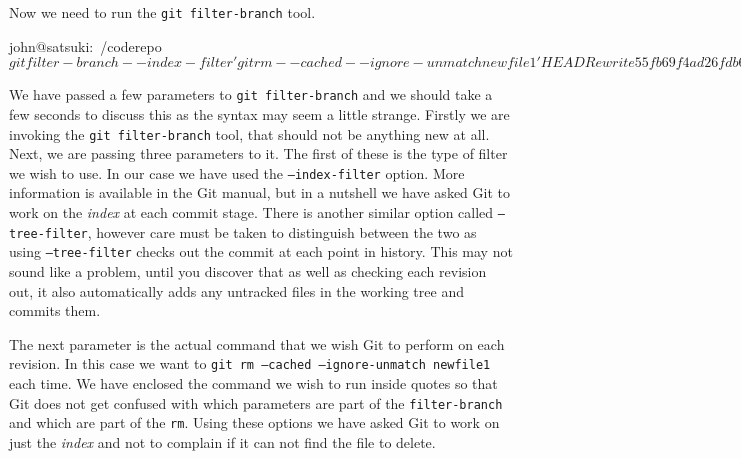 Now we need to run the \texttt{git filter-branch} tool.

\begin{code}
john@satsuki:~/coderepo$ git filter-branch --index-filter 'git rm --cached --ignore-unmatch newfile1' HEAD
Rewrite 55fb69f4ad26fdb6b90ac6f43431be40779962dd (6/21)rm 'newfile1'
Rewrite 9710177657ae00665ca8f8027b17314346a5b1c4 (7/21)rm 'newfile1'
Rewrite 4ac92012609cf8ed2480aa5d7f807caf2545fe2f (8/21)rm 'newfile1'
Rewrite cfbecabb031696a217b77b0e1285f2d5fc2ea2a3 (9/21)rm 'newfile1'
Rewrite b119573f4508514c55e1c4e3bebec0ab3667d071 (10/21)rm 'newfile1'
Rewrite ed2301ba223a63a5a930b536a043444e019460a7 (11/21)rm 'newfile1'
Rewrite a27d49ef11d9f0e66edbad8f6c7806510ad5b2be (12/21)rm 'newfile1'
Rewrite 7cc32dbf121f2afa8c40337db54bafb26de5b9c4 (13/21)rm 'newfile1'
Rewrite d50ffb2fa536d869f2c4e89e8d6a48e0a29c5cc1 (14/21)rm 'newfile1'
Rewrite 9cb2af2a00fd2253060e6bf8cc6c377b3d55ecea (15/21)rm 'newfile1'
Rewrite 37950f861a3cc0868c65ee9571fc6c491aa689ea (16/21)rm 'newfile1'
Rewrite 1c3206aac0fb012bfdaf5ff00e320b565bb89e7d (17/21)rm 'newfile1'
Rewrite 1968324ce2899883fca76bc25496bcf2b15e7011 (18/21)rm 'newfile1'
Rewrite f8d5100142b43ffaba9bbd539ba4fd92af79bf0e (19/21)rm 'newfile1'
Rewrite a8281fb589e36389cc8cb0da7ebee225b4d1adfc (20/21)rm 'newfile1'
Rewrite 30900fe1b7e72411dabab8b02070f36e2431f704 (21/21)rm 'newfile1'

Ref 'refs/heads/remove_file' was rewritten
john@satsuki:~/coderepo$
\end{code}

We have passed a few parameters to \texttt{git filter-branch} and we should take a few seconds to discuss this as the syntax may seem a little strange.
Firstly we are invoking the \texttt{git filter-branch} tool, that should not be anything new at all.
Next, we are passing three parameters to it.
The first of these is the type of filter we wish to use.
In our case we have used the \texttt{--index-filter} option.
More information is available in the Git manual, but in a nutshell we have asked Git to work on the \emph{index} at each commit stage.
There is another similar option called \texttt{--tree-filter}, however care must be taken to distinguish between the two as using \texttt{--tree-filter} checks out the commit at each point in history.
This may not sound like a problem, until you discover that as well as checking each revision out, it also automatically adds any untracked files in the working tree and commits them.

The next parameter is the actual command that we wish Git to perform on each revision.
In this case we want to \texttt{git rm --cached --ignore-unmatch newfile1} each time.
We have enclosed the command we wish to run inside quotes so that Git does not get confused with which parameters are part of the \texttt{filter-branch} and which are part of the \texttt{rm}.
Using these options we have asked Git to work on just the \emph{index} and not to complain if it can not find the file to delete.

